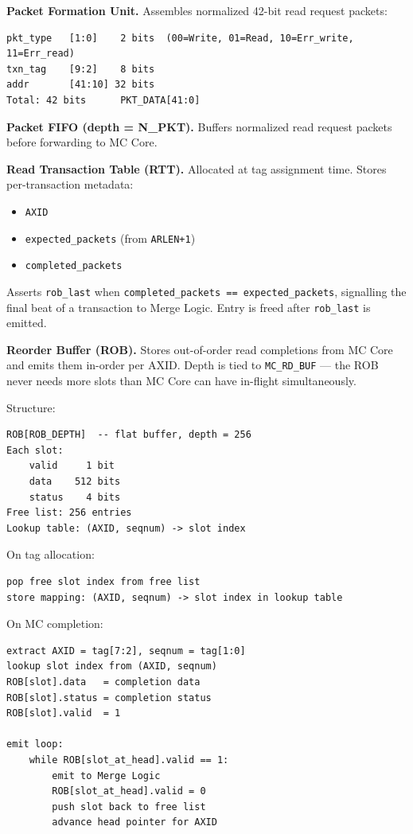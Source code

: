 \textbf{Packet Formation Unit.}
Assembles normalized 42-bit read request packets:
\begin{lstlisting}
pkt_type   [1:0]    2 bits  (00=Write, 01=Read, 10=Err_write, 11=Err_read)
txn_tag    [9:2]    8 bits
addr       [41:10] 32 bits
Total: 42 bits      PKT_DATA[41:0]
\end{lstlisting}

\textbf{Packet FIFO (depth = N\_PKT).}
Buffers normalized read request packets before forwarding to MC Core.

\textbf{Read Transaction Table (RTT).}
Allocated at tag assignment time. Stores per-transaction metadata:
\begin{itemize}[noitemsep]
    \item \texttt{AXID}
    \item \texttt{expected\_packets} (from \texttt{ARLEN+1})
    \item \texttt{completed\_packets}
\end{itemize}
Asserts \texttt{rob\_last} when \texttt{completed\_packets == expected\_packets}, signalling the final beat of a transaction to Merge Logic. Entry is freed after \texttt{rob\_last} is emitted.

\textbf{Reorder Buffer (ROB).}
Stores out-of-order read completions from MC Core and emits them in-order per AXID. Depth is tied to \texttt{MC\_RD\_BUF} — the ROB never needs more slots than MC Core can have in-flight simultaneously.

Structure:
\begin{lstlisting}
ROB[ROB_DEPTH]  -- flat buffer, depth = 256
Each slot:
    valid     1 bit
    data    512 bits
    status    4 bits
Free list: 256 entries
Lookup table: (AXID, seqnum) -> slot index
\end{lstlisting}

On tag allocation:
\begin{lstlisting}
pop free slot index from free list
store mapping: (AXID, seqnum) -> slot index in lookup table
\end{lstlisting}

On MC completion:
\begin{lstlisting}
extract AXID = tag[7:2], seqnum = tag[1:0]
lookup slot index from (AXID, seqnum)
ROB[slot].data   = completion data
ROB[slot].status = completion status
ROB[slot].valid  = 1

emit loop:
    while ROB[slot_at_head].valid == 1:
        emit to Merge Logic
        ROB[slot_at_head].valid = 0
        push slot back to free list
        advance head pointer for AXID
\end{lstlisting}

